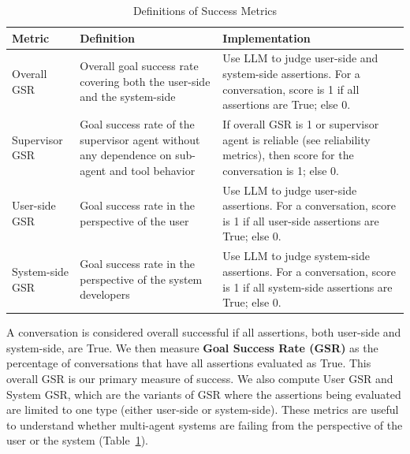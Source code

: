 \begin{table}[t]
    \caption{Definitions of Success Metrics}
    \label{tab:gsr_define}
    \centering
    \footnotesize
    \begin{tabular}{p{2cm}p{5cm}p{5cm}}
    \toprule
    Metric  & Definition & Implementation  \\
    \midrule
    Overall GSR & Overall goal success rate covering both the user-side and the system-side & Use LLM to judge user-side and system-side assertions. For a conversation, score is 1 if all assertions are True; else 0. \\
    \midrule
    Supervisor GSR & Goal success rate of the supervisor agent without any dependence on sub-agent and tool behavior & If overall GSR is 1 or supervisor agent is reliable (see reliability metrics), then score for the conversation is 1; else 0. \\
    \midrule
    User-side GSR & Goal success rate in the perspective of the user & Use LLM to judge user-side assertions. For a conversation, score is 1 if all user-side assertions are True; else 0. \\
    \midrule
    System-side GSR & Goal success rate in the perspective of the system developers & Use LLM to judge system-side assertions. For a conversation, score is 1 if all system-side assertions are True; else 0. \\
    \bottomrule
    \end{tabular}
\end{table}

A conversation is considered overall successful if all assertions, both user-side and system-side, are True. We then measure \textbf{Goal Success Rate (GSR)} as the percentage of conversations that have all assertions evaluated as True. This overall GSR is our primary measure of success. We also compute User GSR and System GSR, which are the variants of GSR where the assertions being evaluated are limited to one type (either user-side or system-side). These metrics are useful to understand whether multi-agent systems are failing from the perspective of the user or the system (Table~\ref{tab:gsr_define}).

